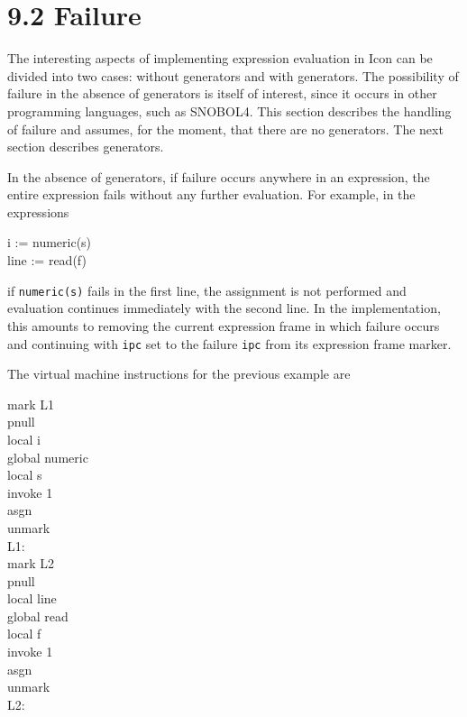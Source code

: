 \section[9.2 Failure]{9.2 Failure}

The interesting aspects of implementing expression evaluation in Icon
can be divided into two cases: without generators and with
generators. The possibility of failure in the absence of generators is
itself of interest, since it occurs in other programming languages,
such as SNOBOL4. This section describes the handling of failure and
assumes, for the moment, that there are no generators. The next
section describes generators.

In the absence of generators, if failure occurs anywhere in an
expression, the entire expression fails without any further
evaluation. For example, in the expressions

\begin{iconcode}
\>i := numeric(s)\\
\>line := read(f)
\end{iconcode}


\noindent if \texttt{numeric(s)} fails in the first line, the
assignment is not performed and evaluation continues immediately with
the second line. In the implementation, this amounts to removing the
current expression frame in which failure occurs and continuing with
\texttt{ipc} set to the failure \texttt{ipc} from its expression frame
marker.

The virtual machine instructions for the previous example are

\begin{iconcode}
\>mark L1\\
\>pnull\\
\>local i\\
\>global numeric\\
\>local s\\
\>invoke 1\\
\>asgn\\
\>unmark\\
L1:\\
\>mark L2\\
\>pnull\\
\>local line\\
\>global read\\
\>local f\\
\>invoke 1\\
\>asgn\\
\>unmark\\
L2:
\end{iconcode}


